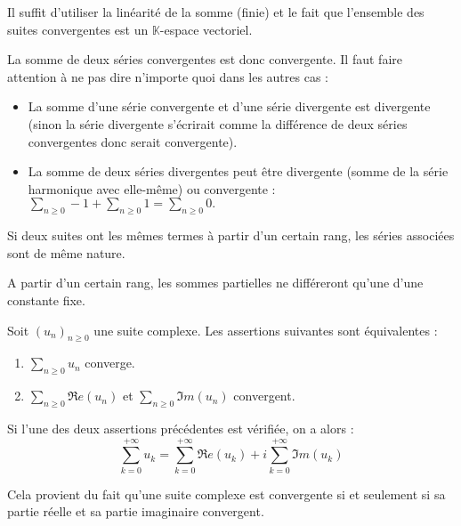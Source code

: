 \documentclass[a4paper,10pt]{report}
\newcommand{\Sum}[2]{\ensuremath{\textstyle{\sum\limits_{#1}^{#2}}}}
\begin{document}
\begin{preuve}
Il suffit d'utiliser la linéarité de la somme (finie) et le fait que l'ensemble des suites convergentes est un $\mathbb{K}$-espace vectoriel.
\end{preuve}

\begin{rem} La somme de deux séries convergentes est donc convergente. Il faut faire attention à ne pas dire n'importe quoi dans les autres cas :
\begin{itemize}
\item La somme d'une série convergente et d'une série divergente est divergente (sinon la série divergente s'écrirait comme la différence de deux séries convergentes donc serait convergente).
\item La somme de deux séries divergentes peut être divergente (somme de la série harmonique avec elle-même) ou convergente :  $\Sum{n \geq 0}{} - 1 +  \Sum{n \geq 0}{} 1 = \Sum{n \geq 0}{} 0.$
\end{itemize}
\end{rem}

\begin{prop} Si deux suites ont les mêmes termes à partir d'un certain rang, les séries associées sont de même nature.
\end{prop}

\begin{preuve}
A partir d'un certain rang, les sommes partielles ne différeront qu'une d'une constante fixe.
\end{preuve}

\begin{prop}\label{ConvSerCompl}
Soit $(u_n)_{n \geq 0}$ une suite complexe. Les assertions suivantes sont équivalentes :

\begin{enumerate}
\item $\Sum{n \geq 0}{} u_n$ converge.
\item $\Sum{n \geq 0}{} \Re e(u_n)$ et $\Sum{n \geq 0}{} \Im m(u_n)$ convergent.
\end{enumerate}
Si l'une des deux assertions précédentes est vérifiée, on a alors :
$$ \sum_{k=0}^{+ \infty} u_k = \sum_{k=0}^{+ \infty} \Re e(u_k) + i \sum_{k=0}^{+ \infty} \Im m(u_k)$$
\end{prop}

\begin{preuve} 
Cela provient du fait qu'une suite complexe est convergente si et seulement si sa partie réelle et sa partie imaginaire convergent.
\end{preuve}
\end{document}

